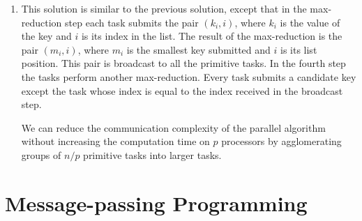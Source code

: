 \begin{enumerate}
\item This solution is similar to the previous solution, except that in
      the max-reduction step each task submits the pair $(k_i, i)$,
      where $k_i$ is the value of the key and $i$ is its index in the list.
      The result of the max-reduction is the pair $(m_i, i)$, where $m_i$
      is the smallest key submitted and $i$ is its list position.
      This pair is broadcast to all the primitive tasks.
      In the fourth step the tasks perform another max-reduction.
      Every task submits a candidate key except the task whose index is equal
      to the index received in the broadcast step.
      
      We can reduce the communication complexity of the parallel algorithm
      without increasing the computation time on $p$ processors by
      agglomerating groups of $n/p$ primitive tasks into larger tasks.

\end{enumerate}

\chapter{Message-passing Programming}

